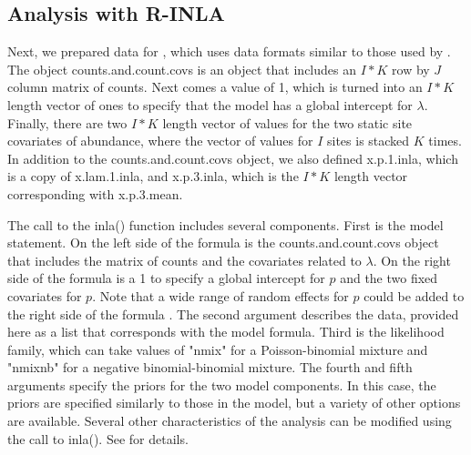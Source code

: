\documentclass[article]{jss}
\begin{document}
\subsection[Analysis with R-INLA]{Analysis with R-INLA}
Next, we prepared data for , which uses data formats similar to those used by . The object counts.and.count.covs is an  object that includes an $I*K$ row by $J$ column matrix of counts. Next comes a value of 1, which is turned into an $I*K$ length vector of ones to specify that the model has a global intercept for $\lambda$. Finally, there are two $I*K$ length vector of values for the two static site covariates of abundance, where the vector of values for $I$ sites is stacked $K$ times.  In addition to the counts.and.count.covs object, we also defined x.p.1.inla, which is a copy of x.lam.1.inla, and x.p.3.inla, which is the $I*K$ length vector corresponding with x.p.3.mean.


The call to the inla() function includes several components.  First is the model statement.  On the left side of the formula is the counts.and.count.covs object that includes the matrix of counts and the covariates related to $\lambda$.  On the right side of the formula is a 1 to specify a global intercept for $p$ and the two fixed covariates for $p$.  Note that a wide range of random effects for $p$ could be added to the right side of the formula \citep{Rue_Martino_Lindgren_Simpson_Riebler_2013}.  The second argument describes the data, provided here as a list that corresponds with the model formula.  Third is the likelihood family, which can take values of "nmix" for a Poisson-binomial mixture and "nmixnb" for a negative binomial-binomial mixture.  The fourth and fifth arguments specify the priors for the two model components.  In this case, the priors are specified similarly to those in the  model, but a variety of other options are available. Several other characteristics of the analysis can be modified using the call to inla().  See \cite{Rue_Martino_Lindgren_Simpson_Riebler_2013} for details.
\end{document}
